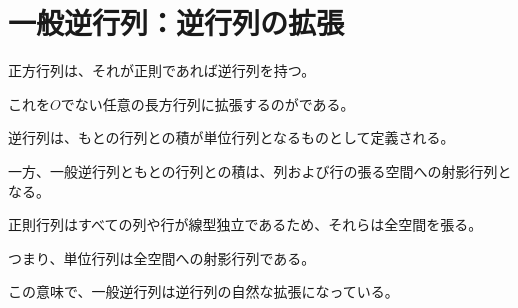 \documentclass[../../../topic_linear-algebra]{subfiles}
\begin{document}
\sectionline
\section{一般逆行列：逆行列の拡張}

正方行列は、それが正則であれば逆行列を持つ。

これを$O$でない任意の長方行列に拡張するのがである。

\br

逆行列は、もとの行列との積が単位行列となるものとして定義される。

一方、一般逆行列ともとの行列との積は、列および行の張る空間への射影行列となる。

\br

正則行列はすべての列や行が線型独立であるため、それらは全空間を張る。

つまり、単位行列は全空間への射影行列である。

\br

この意味で、一般逆行列は逆行列の自然な拡張になっている。
\end{document}
